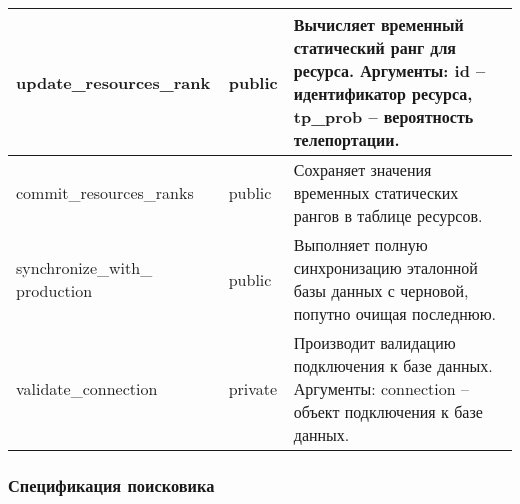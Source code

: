 \begin{xltabular}{\textwidth}{|X|X|X|}
	update\_resources\_rank & public & Вычисляет временный статический ранг для ресурса. Аргументы: id -- идентификатор ресурса, tp\_prob -- вероятность телепортации. \\ \hline
	commit\_resources\_ranks & public & Сохраняет значения временных статических рангов в таблице ресурсов. \\ \hline
	synchronize\_with\_
	production & public & Выполняет полную синхронизацию эталонной базы данных с черновой, попутно очищая последнюю. \\ \hline
	validate\_connection & private & Производит валидацию подключения к базе данных. Аргументы: connection -- объект подключения к базе данных. \\ \hline
\end{xltabular}

\subsubsection{Спецификация поисковика}

